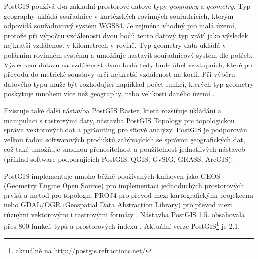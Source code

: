 PostGIS používá dva základní prostorové datové typy {\it geography} a {\it geometry}. Typ geography ukládá souřadnice v kartézských rovinných souřadnicích, kterým odpovídá souřadnicový systém WGS84. Je zejména vhodný pro malá území, protože při výpočtu vzdálenosti dvou bodů tento datový typ vrátí jako výsledek nejkratší vzdálenost v kilometrech v rovině. Typ geometry data ukládá v polárním rovinném systému a umožňuje nastavit souřadnicový systém dle potřeb. Výsledkem dotazu na vzdálenost dvou bodů tedy bude úhel ve stupních, které po převodu do metrické soustavy určí nejkratší vzdálenost na kouli. Při výběru datového typu může být rozhodující například počet funkcí, kterých typ geometry poskytuje mnohem více než geography, nebo velikosti daného území \citep{OpenGeo2012}.

Existuje také další nástavba PostGIS Raster, která rozšiřuje ukládání a manipulaci s rastrovými daty, nástavba PostGIS Topology pro topologickou správu vektorových dat a pgRouting pro síťové analýzy. PostGIS je podporován velkou řadou softwarových produktů zabývajících se správou geografických dat, což také umožňuje snadnou přenositelnost a použitelnost jednotlivých nástaveb (příklad software podporujících PostGIS: QGIS, GvSIG, GRASS, ArcGIS).

PostGIS implementuje mnoho běžně používaných knihoven jako GEOS (Geometry Engine Open Source) pro implementaci jednoduchých prostorových prvků a metod pro topologii, PROJ4 pro převod mezi kartografickými projekcemi nebo GDAL/OGR (Geospatial Data Abstraction Library) pro převod mezi různými vektorovými i rastrovými formáty \citep{ObeHsu2011}. Nástavba PostGIS 1.5. obsahovala přes 800 funkcí, typů a prostorových indexů \citep{ObeHsu2012}. Aktuální verze PostGIS\footnote{aktuálně na http://postgis.refractions.net/} je 2.1.



